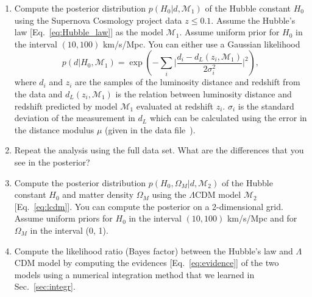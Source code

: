 \begin{enumerate}
\item Compute the posterior distribution $p(H_0 | d, \mathcal{M}_1)$ of the Hubble constant $H_0$ using the Supernova Cosmology project data $z \leq 0.1$. Assume the Hubble's law [Eq.~\eqref{eq:Hubble_law}] as the model $\mathcal{M}_1$. Assume uniform prior for $H_0$ in the interval $(10, 100)$ km/s/Mpc. You can either use a Gaussian likelihood 
\begin{equation}
p(d | H_0, \mathcal{M}_1) = \exp \left( - \sum_i \Big |\dfrac{d_i - d_L(z_i, \mathcal{M}_1)}{2\sigma_{i}^2} \Big |^2 \right), 
\end{equation}
where $d_i$ and $z_i$ are the samples of the luminosity distance and redshift from the data and $d_L(z_i, \mathcal{M}_1)$ is the relation between luminosity distance and redshift predicted by model $\mathcal{M}_1$ evaluated at redshift $z_i$. $\sigma_{i}$ is the standard deviation of the measurement in $d_L$ which can be calculated using the error in the distance modulus $\mu$ (given in the data file~\cite{sndata}). 
\item Repeat the analysis using the full data set. What are the differences that you see in the posterior?
\item Compute the posterior distribution  $p(H_0, \Omega_M | d, \mathcal{M}_2)$ of the Hubble constant $H_0$ and matter density $\Omega_M$ using the $\Lambda$CDM model $\mathcal{M}_2$ [Eq.~\eqref{eq:lcdm}]. You can compute the posterior on a 2-dimensional grid. Assume uniform priors for $H_0$ in the interval $(10, 100)$ km/s/Mpc and for $\Omega_M$ in the interval (0, 1). 
\item Compute the likelihood ratio (Bayes factor) between the Hubble's law and $\Lambda$CDM model by computing the evidences [Eq.~\eqref{eq:evidence}] of the two models using a  numerical integration method that we learned in Sec.~\ref{sec:integr}. 

\end{enumerate}